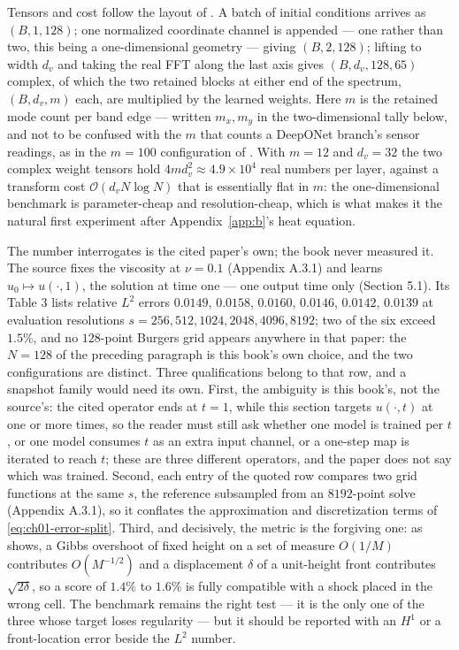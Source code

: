 Tensors and cost follow the layout of
. A batch of initial
conditions arrives as $(B, 1, 128)$; one normalized coordinate channel is
appended --- one rather than two, this being a one-dimensional geometry --- giving
$(B, 2, 128)$; lifting to width $d_v$ and taking the real FFT along the last axis
gives $(B, d_v, 128, 65)$ complex, of which the two retained blocks at either end
of the spectrum, $(B, d_v, m)$ each, are multiplied by the learned weights. Here $m$
is the retained mode count per band edge --- written $m_x, m_y$ in the
two-dimensional tally below, and not to be confused with the $m$ that counts a
DeepONet branch's sensor readings, as in the $m = 100$ configuration of
. With
$m = 12$ and $d_v = 32$ the two complex weight tensors hold
$4 m d_v^{2} \approx 4.9 \times 10^{4}$ real numbers per layer, against a
transform cost $\mathcal{O}(d_v N \log N)$ that is essentially flat in $m$: the
one-dimensional benchmark is parameter-cheap and resolution-cheap, which is what
makes it the natural first experiment after Appendix~\ref{app:b}'s heat equation.

The number
 interrogates is the
cited paper's own; the book never measured it. The source fixes the
viscosity at $\nu = 0.1$ (Appendix A.3.1) and learns
$u_{0} \mapsto u(\cdot, 1)$, the solution at time one --- one output time only
(Section 5.1). Its Table 3 lists relative $L^{2}$ errors
$0.0149$, $0.0158$, $0.0160$, $0.0146$, $0.0142$, $0.0139$ at evaluation
resolutions $s = 256, 512, 1024, 2048, 4096, 8192$; two of the six exceed
$1.5\%$, and no $128$-point Burgers grid appears anywhere in that paper: the
$N = 128$ of the preceding paragraph is this book's own choice, and the two
configurations are distinct. Three qualifications belong to that row, and a
snapshot family would need its own. First, the ambiguity is this book's, not the
source's: the
cited operator ends at $t = 1$, while this section targets $u(\cdot, t)$ at one
or more times, so the reader must still ask whether one model is trained per
$t$, or one model consumes $t$ as an extra input channel, or a one-step map is
iterated to reach $t$; these are three different operators, and the paper does
not say which was trained. Second, each entry of the quoted row compares two
grid functions at the same $s$, the reference subsampled from an $8192$-point
solve (Appendix A.3.1), so it
conflates the approximation and discretization terms of
\eqref{eq:ch01-error-split}. Third, and decisively, the metric is the forgiving
one: as  shows, a
Gibbs overshoot of fixed height on a set of measure $O(1/M)$ contributes
$O(M^{-1/2})$ and a displacement $\delta$ of a unit-height front contributes
$\sqrt{2\delta}$, so a score of $1.4\%$ to $1.6\%$ is fully compatible with a shock placed
in the wrong cell. The benchmark remains the right test --- it is the only one of
the three whose target loses regularity --- but it should be reported with an
$H^{1}$ or a front-location error beside the $L^{2}$ number.

